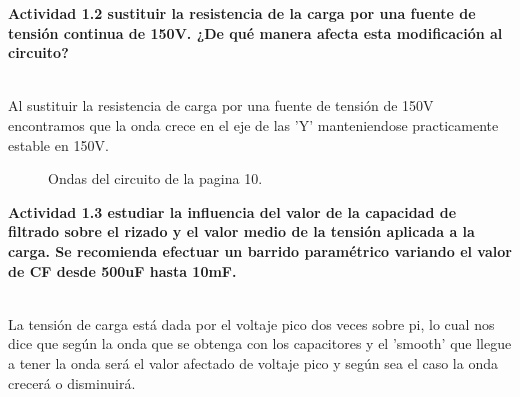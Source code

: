 \documentclass[letterpaper]{article}
\begin{document}
 \begin{large}

\textbf{Actividad 1.2 sustituir la resistencia de la carga por una fuente
de tensión continua de 150V. ¿De qué manera afecta esta modificación
al circuito?}\end{large}\\
Al sustituir la resistencia de carga por una fuente de tensión de 150V encontramos que la onda crece en el eje de las 'Y' manteniendose practicamente estable en 150V.\\
\begin{figure}[htbp]
    \centering
    \caption{Ondas del circuito de la pagina 10.}
    \label{fig:my_labeeel}
\end{figure}
 \begin{large}

\textbf{Actividad 1.3 estudiar la influencia del valor de la capacidad de
filtrado sobre el rizado y el valor medio de la tensión aplicada a
la carga. Se recomienda efectuar un barrido paramétrico variando el
valor de CF desde 500uF hasta 10mF.} \end{large}\\
La tensión de carga está dada por el voltaje pico dos veces sobre pi, lo cual nos dice que según la onda que se obtenga con los capacitores y el 'smooth' que llegue a tener la onda será el valor afectado de voltaje pico y según sea el caso la onda crecerá o disminuirá.\\
\end{document}
